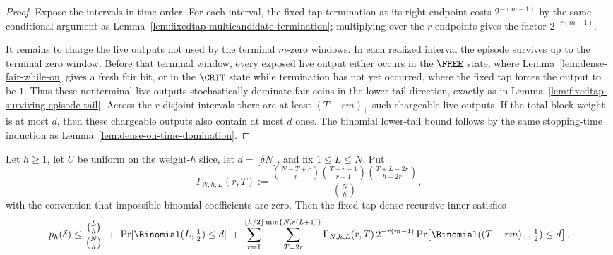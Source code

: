 \begin{proof}
Expose the intervals in time order. For each interval, the fixed-tap termination at its right endpoint costs
\(2^{-(m-1)}\) by the same conditional argument as Lemma~\ref{lem:fixedtap-multicandidate-termination}; multiplying
over the \(r\) endpoints gives the factor \(2^{-r(m-1)}\).

It remains to charge the live outputs not used by the terminal \(m\)-zero windows. In each realized interval the
episode survives up to the terminal zero window. Before that terminal window, every exposed live output either occurs
in the \(\FREE\) state, where Lemma~\ref{lem:dense-fair-while-on} gives a fresh fair bit, or in the \(\CRIT\) state
while termination has not yet occurred, where the fixed tap forces the output to be \(1\). Thus these nonterminal live
outputs stochastically dominate fair coins in the lower-tail direction, exactly as in
Lemma~\ref{lem:fixedtap-surviving-episode-tail}. Across the \(r\) disjoint intervals there are at least
\((T-rm)_+\) such chargeable live outputs. If the total block weight is at most \(d\), then these chargeable outputs
also contain at most \(d\) ones. The binomial lower-tail bound follows by the same stopping-time induction as
Lemma~\ref{lem:dense-on-time-domination}.
\end{proof}

\begin{corollary}
\label{cor:fixedtap-weight-slice-paired-cover}
Let \(h\ge 1\), let \(U\) be uniform on the weight-\(h\) slice, let \(d=\lfloor\delta N\rfloor\), and fix
\(1\le L\le N\). Put
\[
\Gamma_{N,h,L}(r,T)
:=
\frac{
\binom{N-T+r}{r}
\binom{T-r-1}{r-1}
\binom{T+L-2r}{h-2r}
}{
\binom{N}{h}
},
\]
with the convention that impossible binomial coefficients are zero. Then the fixed-tap dense recursive inner satisfies
\[
p_h(\delta)
\le
\frac{\binom{L}{h}}{\binom{N}{h}}
\;+\;
\Pr[\Binomial(L,\tfrac12)\le d]
\;+\;
\sum_{r=1}^{\lfloor h/2\rfloor}
\sum_{T=2r}^{\min\{N,r(L+1)\}}
\Gamma_{N,h,L}(r,T)\,
2^{-r(m-1)}
\Pr\!\left[\Binomial((T-rm)_+,\tfrac12)\le d\right].
\]
\end{corollary}

